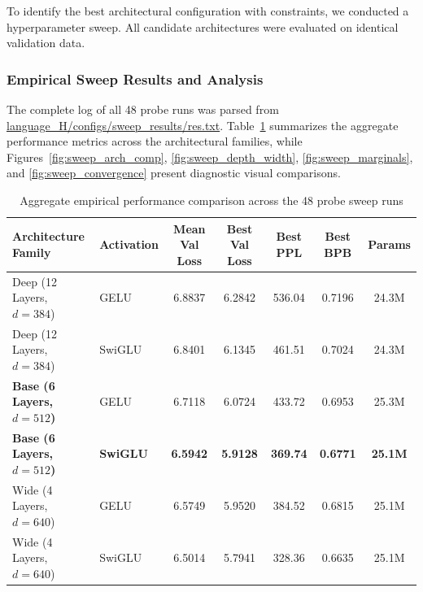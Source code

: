 \documentclass[8pt]{article}
\begin{document}
To identify the best architectural configuration with constraints, we conducted a  hyperparameter sweep. All candidate architectures were evaluated on identical validation data.

\subsubsection{Empirical Sweep Results and Analysis}
The complete log of all 48 probe runs was parsed from \url{language_H/configs/sweep_results/res.txt}. Table~\ref{tab:sweep_results} summarizes the aggregate performance metrics across the architectural families, while Figures~\ref{fig:sweep_arch_comp}, \ref{fig:sweep_depth_width}, \ref{fig:sweep_marginals}, and \ref{fig:sweep_convergence} present diagnostic visual comparisons.

\begin{table}[!htp]
    \centering
    \footnotesize %
    \setlength{\tabcolsep}{3.5pt} %
    \begin{tabular}{llccccc}
        \toprule
        \textbf{Architecture Family} & \textbf{Activation} & \textbf{Mean Val Loss} & \textbf{Best Val Loss} & \textbf{Best PPL} & \textbf{Best BPB} & \textbf{Params} \\
        \midrule
        Deep (12 Layers, $d=384$) & GELU & 6.8837 & 6.2842 & 536.04 & 0.7196 & 24.3M \\
        Deep (12 Layers, $d=384$) & SwiGLU & 6.8401 & 6.1345 & 461.51 & 0.7024 & 24.3M \\
        \midrule
        \textbf{Base (6 Layers, $d=512$)} & GELU & 6.7118 & 6.0724 & 433.72 & 0.6953 & 25.3M \\
        \textbf{Base (6 Layers, $d=512$)} & \textbf{SwiGLU} & \textbf{6.5942} & \textbf{5.9128} & \textbf{369.74} & \textbf{0.6771} & \textbf{25.1M} \\
        \midrule
        Wide (4 Layers, $d=640$) & GELU & 6.5749 & 5.9520 & 384.52 & 0.6815 & 25.1M \\
        Wide (4 Layers, $d=640$) & SwiGLU & 6.5014 & 5.7941 & 328.36 & 0.6635 & 25.1M \\
        \bottomrule
    \end{tabular}
    \caption{Aggregate empirical performance comparison across the 48 probe sweep runs}
    \label{tab:sweep_results}
\end{table}
\end{document}

